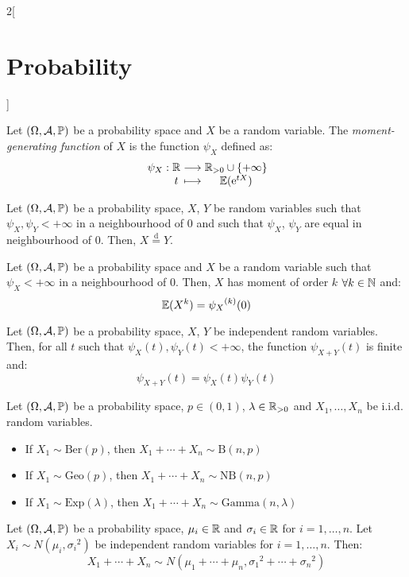 \documentclass[../../../main.tex]{subfiles}
\begin{document}
\begin{multicols}{2}[\section{Probability}]
\begin{corollary}
  \end{corollary}
  \begin{definition}
    Let $(\Omega,\mathcal{A},\mathbb{P})$ be a probability space and $X$ be a random variable. The \textit{moment-generating function} of $X$ is the function $\psi_X$ defined as:
    $$\function{\psi_X}{\RR}{\RR_{>0}\cup\{+\infty\}}{t}{\Exp(\exp{tX})}$$
  \end{definition}
  \begin{theorem}
    Let $(\Omega,\mathcal{A},\mathbb{P})$ be a probability space, $X$, $Y$ be random variables such that $\psi_X,\psi_Y<+\infty$ in a neighbourhood of 0 and such that $\psi_X$, $\psi_Y$ are equal in neighbourhood of 0. Then, $X\overset{\text{d}}{=}Y$.
  \end{theorem}
  \begin{theorem}
    Let $(\Omega,\mathcal{A},\mathbb{P})$ be a probability space and $X$ be a random variable such that $\psi_X<+\infty$ in a neighbourhood of 0. Then, $X$ has moment of order $k$ $\forall k\in\mathbb{N}$ and: $$\mathbb{E}(X^k)={\psi_X}^{(k)}(0)$$
  \end{theorem}
  \begin{theorem}
    Let $(\Omega,\mathcal{A},\mathbb{P})$ be a probability space, $X$, $Y$ be independent random variables. Then, for all $t$ such that $\psi_X(t),\psi_Y(t)<+\infty$, the function $\psi_{X+Y}(t)$ is finite and: $$\psi_{X+Y}(t)=\psi_X(t)\psi_Y(t)$$
  \end{theorem}
  \begin{prop}
    Let $(\Omega,\mathcal{A},\mathbb{P})$ be a probability space, $p\in(0,1)$, $\lambda\in\mathbb{R}_{>0}$ and $X_1,\ldots,X_n$ be i.i.d. random variables.
    \begin{itemize}
      \item If $X_1\sim\text{Ber}(p)$, then $X_1+\cdots+X_n\sim\text{B}(n,p)$
      \item If $X_1\sim\text{Geo}(p)$, then $X_1+\cdots+X_n\sim\text{NB}(n,p)$
      \item If $X_1\sim\text{Exp}(\lambda)$, then $X_1+\cdots+X_n\sim\text{Gamma}(n,\lambda)$
    \end{itemize}
  \end{prop}
  \begin{prop}
    Let $(\Omega,\mathcal{A},\mathbb{P})$ be a probability space, $\mu_i\in\mathbb{R}$ and $\sigma_i\in\mathbb{R}$ for $i=1,\ldots,n$. Let $X_i\sim N(\mu_i,{\sigma_i}^2)$ be independent random variables for $i=1,\ldots,n$. Then: $$X_1+\cdots+X_n\sim N(\mu_1+\cdots+\mu_n,{\sigma_1}^2+\cdots+{\sigma_n}^2)$$
  \end{prop}

\end{multicols}
\end{document}

